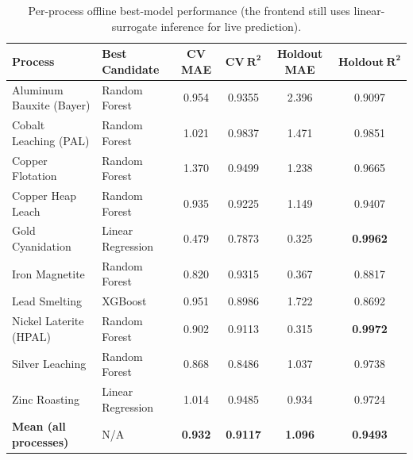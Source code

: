 \documentclass[12pt,a4paper]{report}
\begin{document}
\begin{table}[H]
\centering
\caption{Per-process offline best-model performance (the frontend still uses linear-surrogate inference for live prediction).}
\label{tab:model_results}
\footnotesize
\begin{tabular}{@{} l l c c c c @{}}
\toprule
\textbf{Process} & \textbf{Best Candidate} & \textbf{CV MAE} & $\boldsymbol{CV\ R^2}$ & \textbf{Holdout MAE} & $\boldsymbol{Holdout\ R^2}$ \\
\midrule
Aluminum Bauxite (Bayer)  & Random Forest    & 0.954 & 0.9355 & 2.396 & 0.9097 \\
Cobalt Leaching (PAL)     & Random Forest    & 1.021 & 0.9837 & 1.471 & 0.9851 \\
Copper Flotation          & Random Forest    & 1.370 & 0.9499 & 1.238 & 0.9665 \\
Copper Heap Leach         & Random Forest    & 0.935 & 0.9225 & 1.149 & 0.9407 \\
Gold Cyanidation          & Linear Regression & 0.479 & 0.7873 & 0.325 & \textbf{0.9962} \\
Iron Magnetite            & Random Forest    & 0.820 & 0.9315 & 0.367 & 0.8817 \\
Lead Smelting             & XGBoost          & 0.951 & 0.8986 & 1.722 & 0.8692 \\
Nickel Laterite (HPAL)    & Random Forest    & 0.902 & 0.9113 & 0.315 & \textbf{0.9972} \\
Silver Leaching           & Random Forest    & 0.868 & 0.8486 & 1.037 & 0.9738 \\
Zinc Roasting             & Linear Regression & 1.014 & 0.9485 & 0.934 & 0.9724 \\
\midrule
\textbf{Mean (all processes)} & N/A & \textbf{0.932} & \textbf{0.9117} & \textbf{1.096} & \textbf{0.9493} \\
\bottomrule
\end{tabular}
\end{table}


\end{document}
